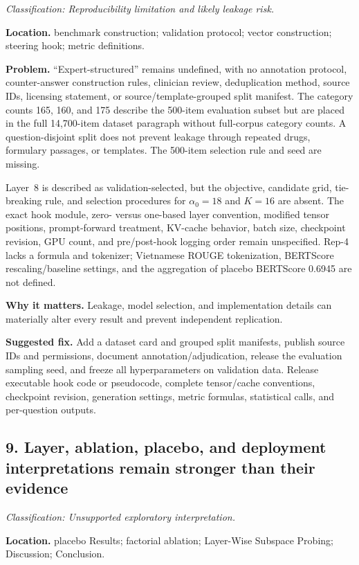 \documentclass[11pt]{article}
\newcommand{\findinglabel}[1]{\textbf{#1}}
\newcommand{\classification}[1]{\textit{Classification: #1.}}
\begin{document}
\classification{Reproducibility limitation and likely leakage risk}

\findinglabel{Location.} benchmark construction; validation protocol; vector construction; steering hook; metric definitions.

\findinglabel{Problem.} ``Expert-structured'' remains undefined, with no annotation protocol, counter-answer construction rules, clinician review, deduplication method, source IDs, licensing statement, or source/template-grouped split manifest.  The category counts 165, 160, and 175 describe the 500-item evaluation subset but are placed in the full 14,700-item dataset paragraph without full-corpus category counts.  A question-disjoint split does not prevent leakage through repeated drugs, formulary passages, or templates.  The 500-item selection rule and seed are missing.

Layer~8 is described as validation-selected, but the objective, candidate grid, tie-breaking rule, and selection procedures for $\alpha_0=18$ and $K=16$ are absent.  The exact hook module, zero- versus one-based layer convention, modified tensor positions, prompt-forward treatment, KV-cache behavior, batch size, checkpoint revision, GPU count, and pre/post-hook logging order remain unspecified.  Rep-4 lacks a formula and tokenizer; Vietnamese ROUGE tokenization, BERTScore rescaling/baseline settings, and the aggregation of placebo BERTScore 0.6945 are not defined.

\findinglabel{Why it matters.} Leakage, model selection, and implementation details can materially alter every result and prevent independent replication.

\findinglabel{Suggested fix.} Add a dataset card and grouped split manifests, publish source IDs and permissions, document annotation/adjudication, release the evaluation sampling seed, and freeze all hyperparameters on validation data.  Release executable hook code or pseudocode, complete tensor/cache conventions, checkpoint revision, generation settings, metric formulas, statistical calls, and per-question outputs.

\subsection*{9. Layer, ablation, placebo, and deployment interpretations remain stronger than their evidence}

\classification{Unsupported exploratory interpretation}

\findinglabel{Location.} placebo Results; factorial ablation; Layer-Wise Subspace Probing; Discussion; Conclusion.
\end{document}
